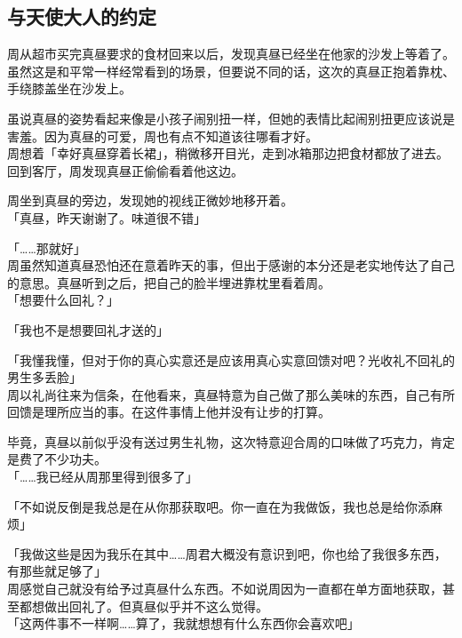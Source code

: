 \subsection{与天使大人的约定}

周从超市买完真昼要求的食材回来以后，发现真昼已经坐在他家的沙发上等着了。\\

虽然这是和平常一样经常看到的场景，但要说不同的话，这次的真昼正抱着靠枕、手绕膝盖坐在沙发上。

虽说真昼的姿势看起来像是小孩子闹别扭一样，但她的表情比起闹别扭更应该说是害羞。因为真昼的可爱，周也有点不知道该往哪看才好。\\

周想着「幸好真昼穿着长裙」，稍微移开目光，走到冰箱那边把食材都放了进去。回到客厅，周发现真昼正偷偷看着他这边。

周坐到真昼的旁边，发现她的视线正微妙地移开着。\\

「真昼，昨天谢谢了。味道很不错」

「……那就好」\\

周虽然知道真昼恐怕还在意着昨天的事，但出于感谢的本分还是老实地传达了自己的意思。真昼听到之后，把自己的脸半埋进靠枕里看着周。\\

「想要什么回礼？」

「我也不是想要回礼才送的」

「我懂我懂，但对于你的真心实意还是应该用真心实意回馈对吧？光收礼不回礼的男生多丢脸」\\

周以礼尚往来为信条，在他看来，真昼特意为自己做了那么美味的东西，自己有所回馈是理所应当的事。在这件事情上他并没有让步的打算。

毕竟，真昼以前似乎没有送过男生礼物，这次特意迎合周的口味做了巧克力，肯定是费了不少功夫。\\

「……我已经从周那里得到很多了」

「不如说反倒是我总是在从你那获取吧。你一直在为我做饭，我也总是给你添麻烦」

「我做这些是因为我乐在其中……周君大概没有意识到吧，你也给了我很多东西，有那些就足够了」\\

周感觉自己就没有给予过真昼什么东西。不如说周因为一直都在单方面地获取，甚至都想做出回礼了。但真昼似乎并不这么觉得。\\

「这两件事不一样啊……算了，我就想想有什么东西你会喜欢吧」\\

